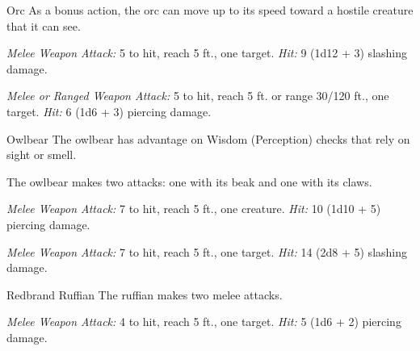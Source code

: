 \documentclass[10pt,a4paper,twoside,bg=print,twocolumn,openany,nodeprecatedcode]{dndbook}
\begin{document}
\begin{DndMonster}[float=t]{Orc}
\DndMonsterBasics[
armor-class = {13 (\textit{hide armor})},
hit-points = {\DndDice{2d8 + 6}},
speed = {30 ft.}
]
\DndMonsterAbilityScores[
 str = 16,
 dex = 12,
 con = 16,
 int = 7,
 wis = 11,
 cha = 10
]
\DndMonsterDetails[
skills = {Intimidation +2},
senses = {darkvision 60 ft., passive perception 10},
languages = {Common, Orc},
challenge = 1/2,
]
As a bonus action, the orc can move up to its speed toward a hostile creature that it can see.

\textsl{Melee Weapon Attack:} 5 to hit, reach 5 ft., one target. \textsl{Hit:} 9 (1d12 + 3) slashing damage.

\textsl{Melee or Ranged Weapon Attack:} 5 to hit, reach 5 ft. or range 30/120 ft., one target. \textsl{Hit:} 6 (1d6 + 3) piercing damage.

\end{DndMonster}


\clearpage

\begin{DndMonster}[float=t]{Owlbear}
\DndMonsterBasics[
armor-class = {13 (natural armor)},
hit-points = {\DndDice{7d10 + 21}},
speed = {40 ft.}
]
\DndMonsterAbilityScores[
 str = 20,
 dex = 12,
 con = 17,
 int = 3,
 wis = 12,
 cha = 7
]
\DndMonsterDetails[
skills = {Perception +3},
senses = {darkvision 60 ft., passive perception 13},
challenge = 3,
]
The owlbear has advantage on Wisdom (Perception) checks that rely on sight or smell.

The owlbear makes two attacks: one with its beak and one with its claws.

\textsl{Melee Weapon Attack:} 7 to hit, reach 5 ft., one creature. \textsl{Hit:} 10 (1d10 + 5) piercing damage.

\textsl{Melee Weapon Attack:} 7 to hit, reach 5 ft., one target. \textsl{Hit:} 14 (2d8 + 5) slashing damage.

\end{DndMonster}



\begin{DndMonster}[float=t]{Redbrand Ruffian}
\DndMonsterBasics[
armor-class = {14 (studded leather armor)},
hit-points = {\DndDice{3d8 + 3}},
speed = {30 ft.}
]
\DndMonsterAbilityScores[
 str = 11,
 dex = 14,
 con = 12,
 int = 9,
 wis = 9,
 cha = 11
]
\DndMonsterDetails[
skills = {Intimidation +2},
languages = {Common},
challenge = 1/2,
]
The ruffian makes two melee attacks.

\textsl{Melee Weapon Attack:} 4 to hit, reach 5 ft., one target. \textsl{Hit:} 5 (1d6 + 2) piercing damage.

\end{DndMonster}
\end{document}
